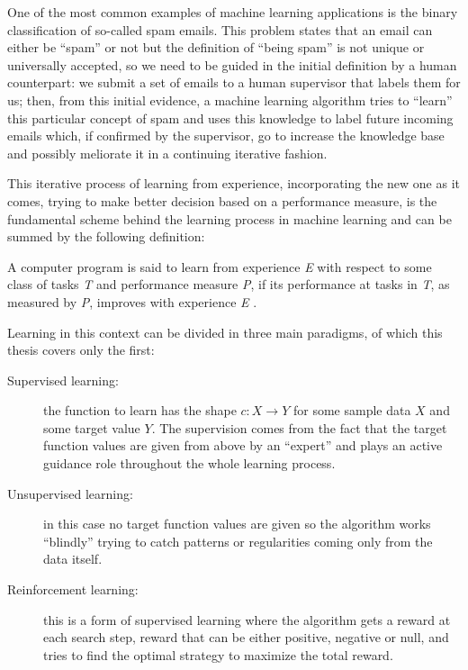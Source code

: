 One of the most common examples of machine learning applications is the binary
classification of so-called spam emails.
This problem states that an email can either be ``spam'' or not but the definition
of ``being spam'' is not unique or universally accepted, so we need to be guided
in the initial definition by a human counterpart: we submit a set of emails to a
human supervisor that labels them for us; then, from this initial evidence, a
machine learning algorithm tries to ``learn'' this particular concept of spam
and uses this knowledge to label future incoming emails which, if confirmed by the
supervisor, go to increase the knowledge base and possibly meliorate it in
a continuing iterative fashion.

This iterative process of learning from experience, incorporating the new one
as it comes, trying to make better decision based on a performance measure, is
the fundamental scheme behind the learning process in machine learning and can
be summed by the following definition:

\begin{definition}[Learning]
    A computer program is said to learn from experience \emph{E} with
    respect to some class of tasks \emph{T} and performance measure \emph{P},
    if its performance at tasks in \emph{T}, as measured by \emph{P}, improves
    with experience \emph{E} \cite{ML}.
\end{definition}

Learning in this context can be divided in three main paradigms, of which this
thesis covers only the first:
\begin{description}
    \item [Supervised learning:] the function to learn has the shape
    $c: X \to Y$ for some sample data $X$ and some target value $Y$.
    The supervision comes from the fact that the target function values are
    given from above by an ``expert'' and plays an active guidance role throughout
    the whole learning process.
    \item [Unsupervised learning:] in this case no target function values are
        given so the algorithm works ``blindly'' trying to catch patterns or
        regularities coming only from the data itself.
    \item [Reinforcement learning:] this is a form of supervised learning
        where the algorithm gets a reward at each search step, reward that can
        be either positive, negative or null, and tries to find the optimal
        strategy to maximize the total reward.
\end{description}

